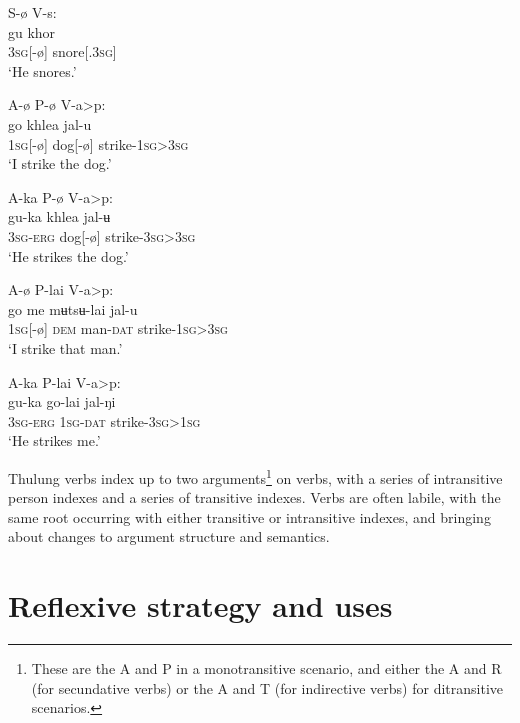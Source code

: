\documentclass[output=paper]{langscibook}
\begin{document}
  

\ea%
    \label{ex:Lahaussois:2}
    S-ø V-s:\\
    \gll gu      khor\\
        3\textsc{sg}[{}-ø]   snore[.3\textsc{sg}]\\
    \glt ‘He snores.'
    \z

  

\ea%
    \label{ex:Lahaussois:3}
    A-ø P-ø V-a>p:\\
    \gll go khlea jal-u\\
        1\textsc{sg[}{}-ø]   dog[-ø]   strike-\textsc{1sg>3sg}\\
    \glt ‘I strike the dog.'
    \z

           

  

  

  

\ea%
    \label{ex:Lahaussois:4}
    A-ka P-ø V-a>p:\\
    \gll gu-ka khlea jal-ʉ\\
         3\textsc{sg-erg} dog[-ø] strike-\textsc{3sg>3sg}\\
    \glt ‘He strikes the dog.'
    \z

\ea%
    \label{ex:Lahaussois:5}
    A-ø P-lai V-a>p:\\
    \gll go me  mʉtsʉ-lai jal-u\\
        1\textsc{sg[}{}-ø]    \textsc{dem}   man\textsc{{}-dat}   strike-\textsc{1sg>3sg}\\
    \glt ‘I strike that man.'
    \z


  

\ea%
    \label{ex:Lahaussois:6}
    A-ka P-lai V-a>p:\\
    \gll gu-ka go-lai jal-ŋi\\
        \textsc{3sg-erg} \textsc{1sg-dat}   strike\textsc{{}-3sg>1sg}\\
    \glt ‘He strikes me.'
    \z
    
Thulung verbs index up to two arguments\footnote{These are the A and P in a monotransitive scenario, and either the A and R (for secundative verbs) or the A and T (for indirective verbs) for ditransitive scenarios.} on verbs, with a series of intransitive person indexes and a series of transitive indexes. Verbs are often labile, with the same root occurring with either transitive or intransitive indexes, and bringing about changes to argument structure and semantics.


\section{Reflexive strategy and uses}
\label{sec:Lahaussois:3}
\end{document}
